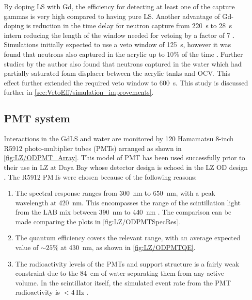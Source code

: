 By doping LS with Gd, the efficiency for detecting at least one of the capture gammas is very high compared to having pure LS. Another advantage of Gd-doping is reduction in the time delay for neutron capture from 220~\textmu s to 28~\textmu s intern reducing the length of the window needed for vetoing by a factor of 7 \cite{LZTDR}. Simulations initially expected to use a veto window of 125~\textmu s, however it was found that neutrons also captured in the acrylic up to 10\% of the time \cite{LZTDR}. Further studies by the author also found that neutrons captured in the water which had partially saturated foam displacer between the acrylic tanks and OCV. This effect further extended the required veto window to 600~\textmu s. This study is discussed further in \autoref{sec:VetoEff/simulation_improvements}.

\subsection{PMT system}\label{sec:LZ/ODPMTs}
Interactions in the GdLS and water are monitored by 120 Hamamatsu 8-inch R5912 photo-multiplier tubes (PMTs) arranged as shown in \autoref{fig:LZ/ODPMT_Array}. 
This model of PMT has been used successfully prior to their use in LZ at Daya Bay whose detector design is echoed in the LZ OD design \cite{Cao:2016vwh}. The R5912 PMTs were chosen because of the following reasons:
\begin{enumerate} 
    \item The spectral response ranges from 300~nm to 650~nm, with a peak wavelength at 420~nm. This encompasses the range of the scintillation light from the LAB mix between 390~nm to 440~nm \cite{Haselschwardt:2018vmp}. The comparison can be made comparing the plots in \autoref{fig:LZ/ODPMTSpecRes}.
    \item The quantum efficiency covers the relevant range, with an average expected value of $\sim25\%$ at 430~nm, as shown in \autoref{fig:LZ/ODPMTQE}.
    \item The radioactivity levels of the PMTs and support structure is a fairly weak constraint due to the 84~cm of water separating them from any active volume. In the scintillator itself, the simulated event rate from the PMT radioactivity is $<4~\text{Hz}$ \cite{LZTDR}. 
\end{enumerate}
